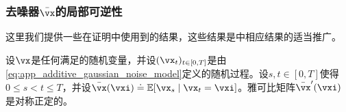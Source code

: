 \documentclass[../../book-main_zh.tex]{subfiles}
\begin{document}
\subsubsection{去噪器\(\bar{\vx}\)的局部可逆性}

这里我们提供一些在证明中使用到的结果，这些结果是\cite{Gribonval2011-pf}中相应结果的适当推广。

\begin{lemma}\label{lem:gribonval_A1}
    设\(\vx\)是任何满足的随机变量，并设\((\vx_{t})_{t \in [0, T]}\)是由\eqref{eq:app_additive_gaussian_noise_model}定义的随机过程。设\(s, t \in [0, T]\)使得\(0 \leq s < t \leq T\)，并设\(\bar{\vx}(\vxi) \doteq \Ex[\vx_{s} \mid \vx_{t} = \vxi]\)。雅可比矩阵\(\bar{\vx}^{\prime}(\vxi)\)是对称正定的。
\end{lemma}
\end{document}
